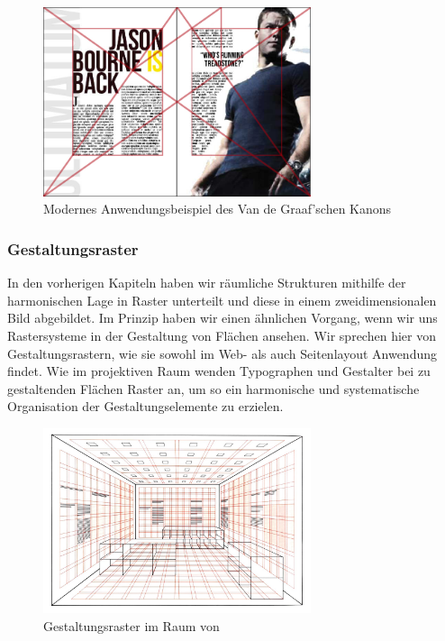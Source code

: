 \documentclass[12pt,a4paper]{article}
\begin{document}
\begin{figure}[htbp]
\centering
\includegraphics[width=0.7\textwidth]{Bilder/jsonBourne2.jpg}
\caption{Modernes Anwendungsbeispiel des Van de Graaf'schen Kanons}
\label{fig:modernSatz}
\end{figure}

\newpage
\subsubsection{Gestaltungsraster}
In den vorherigen Kapiteln haben wir räumliche Strukturen mithilfe der harmonischen Lage in Raster unterteilt und diese in einem zweidimensionalen Bild abgebildet. Im Prinzip haben wir einen ähnlichen Vorgang, wenn wir uns Rastersysteme in der Gestaltung von Flächen ansehen. Wir sprechen hier von Gestaltungsrastern, wie sie sowohl im Web- als auch Seitenlayout Anwendung findet. Wie im projektiven Raum wenden Typographen und Gestalter bei zu gestaltenden Flächen Raster an, um so ein harmonische und systematische Organisation der Gestaltungselemente zu erzielen.

\begin{figure}[htbp]
\centering
\includegraphics[width=0.7\textwidth]{Bilder/3d-grid_brockmann.jpeg}
\caption{Gestaltungsraster im Raum von \citep[S.~148]{gestaltungsraster}}
\label{fig:modernSatz}
\end{figure}
\end{document}
